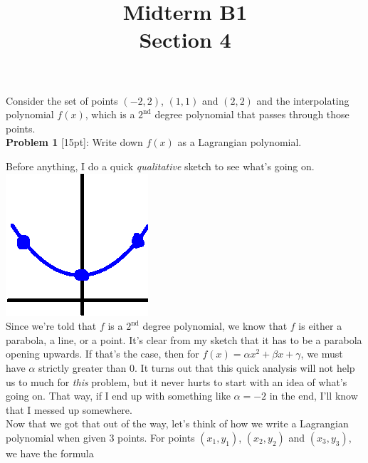 \documentclass{article}
\def\a{\alpha}
\def\b{\beta}
\def\c{\gamma}
\begin{document}
 
 
 
\title{
    \textmd{\Huge{Midterm B1}}\\
    \textmd{\huge{Section 4}}
}


\maketitle

Consider the set of points $(-2, 2)$, $(1, 1)$ and $(2, 2)$ and the interpolating polynomial $f(x)$, which is a $2^\text{nd}$ degree polynomial that passes through those points. \\

\textbf{Problem 1} [15pt]: Write down $f(x)$ as a Lagrangian polynomial.

Before anything, I do a quick \textit{qualitative} sketch to see what's going on. \hspace*{3cm}\includegraphics[scale=0.5]{thumbSketch}\\

Since we're told that $f$ is a $2^\text{nd}$ degree polynomial, we know that $f$ is either a parabola, a line, or a point. It's clear from my sketch that it has to be a parabola opening upwards. If that's the case, then for $f(x) = \a x^2 + \b x + \c$, we must have $\a$ strictly greater than $0$. It turns out that this quick analysis will not help us to much for \textit{this} problem, but it never hurts to start with an idea of what's going on. That way, if I end up with something like $\a = -2$ in the end, I'll know that I messed up somewhere. \\

Now that we got that out of the way, let's think of how we write a Lagrangian polynomial when given 3 points. For points $(x_1, y_1)$, $(x_2, y_2)$ and $(x_3, y_3)$, we have the formula \\
\end{document}
